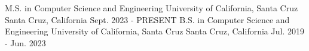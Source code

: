 

\begin{cventries}

  \cventry
    {M.S. in Computer Science and Engineering} %
    {University of California, Santa Cruz} %
    {Santa Cruz, California} %
    {Sept. 2023 - PRESENT} %
    {}
  \vspace{0.2in}
  \cventry
    {B.S. in Computer Science and Engineering} %
    {University of California, Santa Cruz} %
    {Santa Cruz, California} %
    {Jul. 2019 - Jun. 2023} %
    {
    }

\end{cventries}

